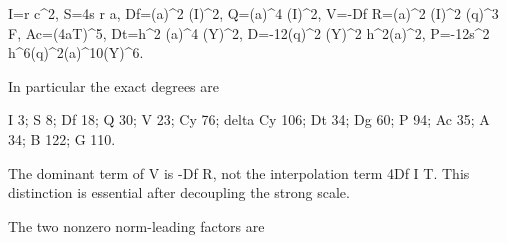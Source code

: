 I\textasteriskcentered{}\allowbreak{}=\allowbreak{}r c\textasciicircum{}\allowbreak{}2, S\textasteriskcentered{}\allowbreak{}=\allowbreak{}4s r a\textasteriskcentered{}\allowbreak{}, Df\textasteriskcentered{}\allowbreak{}=\allowbreak{}(a\textasteriskcentered{}\allowbreak{})\textasciicircum{}\allowbreak{}2 (I\textasteriskcentered{}\allowbreak{})\textasciicircum{}\allowbreak{}2, Q\textasteriskcentered{}\allowbreak{}=\allowbreak{}(a\textasteriskcentered{}\allowbreak{})\textasciicircum{}\allowbreak{}4 (I\textasteriskcentered{}\allowbreak{})\textasciicircum{}\allowbreak{}2, V\textasteriskcentered{}\allowbreak{}=\allowbreak{}-Df\textasteriskcentered{}\allowbreak{} R\textasteriskcentered{}\allowbreak{}=\allowbreak{}(a\textasteriskcentered{}\allowbreak{})\textasciicircum{}\allowbreak{}2 (I\textasteriskcentered{}\allowbreak{})\textasciicircum{}\allowbreak{}2 (q\textasteriskcentered{}\allowbreak{})\textasciicircum{}\allowbreak{}3 F\textasteriskcentered{}\allowbreak{}, Ac\textasteriskcentered{}\allowbreak{}=\allowbreak{}(4a\textasteriskcentered{}\allowbreak{}T)\textasciicircum{}\allowbreak{}5, Dt\textasteriskcentered{}\allowbreak{}=\allowbreak{}h\textasciicircum{}\allowbreak{}2 (a\textasteriskcentered{}\allowbreak{})\textasciicircum{}\allowbreak{}4 (Y\textasteriskcentered{}\allowbreak{})\textasciicircum{}\allowbreak{}2, D\textasteriskcentered{}\allowbreak{}=\allowbreak{}-12(q\textasteriskcentered{}\allowbreak{})\textasciicircum{}\allowbreak{}2 (Y\textasteriskcentered{}\allowbreak{})\textasciicircum{}\allowbreak{}2 h\textasciicircum{}\allowbreak{}2(a\textasteriskcentered{}\allowbreak{})\textasciicircum{}\allowbreak{}2, P\textasteriskcentered{}\allowbreak{}=\allowbreak{}-12s\textasciicircum{}\allowbreak{}2 h\textasciicircum{}\allowbreak{}6(q\textasteriskcentered{}\allowbreak{})\textasciicircum{}\allowbreak{}2(a\textasteriskcentered{}\allowbreak{})\textasciicircum{}\allowbreak{}10(Y\textasteriskcentered{}\allowbreak{})\textasciicircum{}\allowbreak{}6.



In particular the exact degrees are



I 3; S 8; Df 18; Q 30; V 23; Cy 76; delta Cy 106; Dt 34; Dg 60; P 94; Ac 35; A 34; B 122; G 110.



The dominant term of V is -Df R, not the interpolation term 4Df I T. This distinction is essential after decoupling the strong scale.



The two nonzero norm-leading factors are



